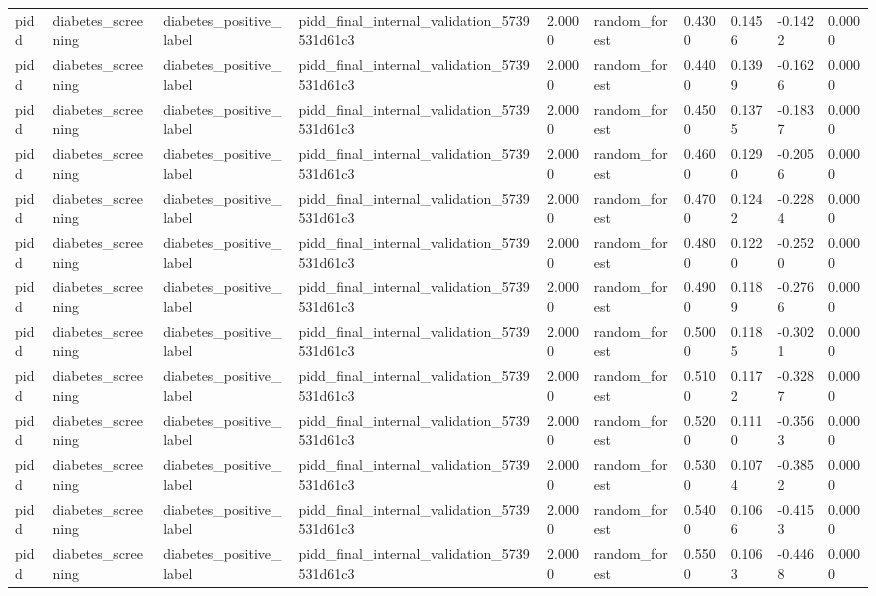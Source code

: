 \begin{tabular}{llllllllll}
pidd & diabetes\_screening & diabetes\_positive\_label & pidd\_final\_internal\_validation\_5739531d61c3 & 2.0000 & random\_forest & 0.4300 & 0.1456 & -0.1422 & 0.0000 \\
pidd & diabetes\_screening & diabetes\_positive\_label & pidd\_final\_internal\_validation\_5739531d61c3 & 2.0000 & random\_forest & 0.4400 & 0.1399 & -0.1626 & 0.0000 \\
pidd & diabetes\_screening & diabetes\_positive\_label & pidd\_final\_internal\_validation\_5739531d61c3 & 2.0000 & random\_forest & 0.4500 & 0.1375 & -0.1837 & 0.0000 \\
pidd & diabetes\_screening & diabetes\_positive\_label & pidd\_final\_internal\_validation\_5739531d61c3 & 2.0000 & random\_forest & 0.4600 & 0.1290 & -0.2056 & 0.0000 \\
pidd & diabetes\_screening & diabetes\_positive\_label & pidd\_final\_internal\_validation\_5739531d61c3 & 2.0000 & random\_forest & 0.4700 & 0.1242 & -0.2284 & 0.0000 \\
pidd & diabetes\_screening & diabetes\_positive\_label & pidd\_final\_internal\_validation\_5739531d61c3 & 2.0000 & random\_forest & 0.4800 & 0.1220 & -0.2520 & 0.0000 \\
pidd & diabetes\_screening & diabetes\_positive\_label & pidd\_final\_internal\_validation\_5739531d61c3 & 2.0000 & random\_forest & 0.4900 & 0.1189 & -0.2766 & 0.0000 \\
pidd & diabetes\_screening & diabetes\_positive\_label & pidd\_final\_internal\_validation\_5739531d61c3 & 2.0000 & random\_forest & 0.5000 & 0.1185 & -0.3021 & 0.0000 \\
pidd & diabetes\_screening & diabetes\_positive\_label & pidd\_final\_internal\_validation\_5739531d61c3 & 2.0000 & random\_forest & 0.5100 & 0.1172 & -0.3287 & 0.0000 \\
pidd & diabetes\_screening & diabetes\_positive\_label & pidd\_final\_internal\_validation\_5739531d61c3 & 2.0000 & random\_forest & 0.5200 & 0.1110 & -0.3563 & 0.0000 \\
pidd & diabetes\_screening & diabetes\_positive\_label & pidd\_final\_internal\_validation\_5739531d61c3 & 2.0000 & random\_forest & 0.5300 & 0.1074 & -0.3852 & 0.0000 \\
pidd & diabetes\_screening & diabetes\_positive\_label & pidd\_final\_internal\_validation\_5739531d61c3 & 2.0000 & random\_forest & 0.5400 & 0.1066 & -0.4153 & 0.0000 \\
pidd & diabetes\_screening & diabetes\_positive\_label & pidd\_final\_internal\_validation\_5739531d61c3 & 2.0000 & random\_forest & 0.5500 & 0.1063 & -0.4468 & 0.0000 \\

\end{tabular}
